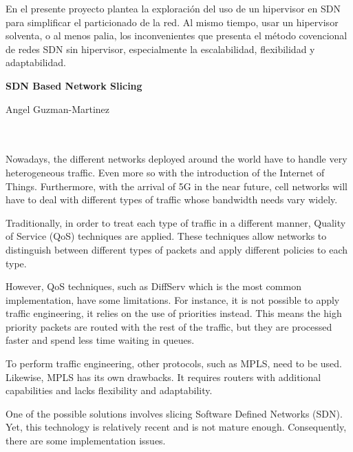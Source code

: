 En el presente proyecto plantea la exploración del uso de un hipervisor en SDN para simplificar el particionado de la red. Al mismo tiempo, usar un hipervisor solventa, o al menos palia, los inconvenientes que presenta el método covencional de redes SDN sin hipervisor, especialmente la escalabilidad, flexibilidad y adaptabilidad.

\cleardoublepage


\thispagestyle{empty}


\begin{center}
{\large\bfseries SDN Based Network Slicing}\\
\end{center}
\begin{center}
Angel Guzman-Martinez\\
\end{center}

\\

\vspace{0.7cm}
\\

Nowadays, the different networks deployed around the world have to handle very heterogeneous traffic. Even more so with the introduction of the Internet of Things. Furthermore, with the arrival of 5G in the near future, cell networks will have to deal with different types of traffic whose bandwidth needs vary widely.

Traditionally, in order to treat each type of traffic in a different manner, Quality of Service (QoS) techniques are applied. These techniques allow networks to distinguish between different types of packets and apply different policies to each type.

However, QoS techniques, such as DiffServ which is the most common implementation, have some limitations. For instance, it is not possible to apply traffic engineering, it relies on the use of priorities instead. This means the high priority packets are routed with the rest of the traffic, but they are processed faster and spend less time waiting in queues. 

To perform traffic engineering, other protocols, such as MPLS, need to be used. Likewise, MPLS has its own drawbacks. It requires routers with additional capabilities and lacks flexibility and adaptability.

One of the possible solutions involves slicing Software Defined Networks (SDN). Yet, this technology is relatively recent and is not mature enough. Consequently, there are some implementation issues.

